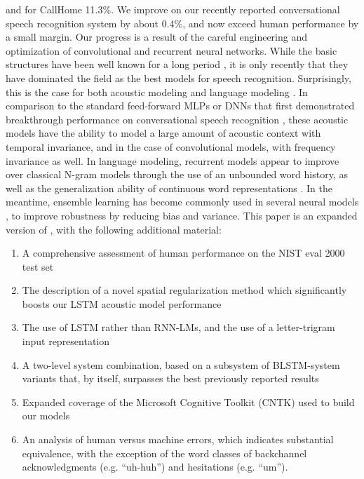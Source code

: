 \documentclass{article}
\begin{document}
and for CallHome 11.3\%. We improve on our recently reported
conversational speech recognition system \cite{ms-swb-icassp2017} by about 0.4\%, and now 
exceed human performance by a small margin. 
Our progress is a result of the careful engineering and optimization
of convolutional and recurrent neural networks. While the 
basic structures have been well known
for a long period \cite{pineda1987generalization,williams1989learning,waibel1989phoneme,lecun1995convolutional,lecun1989backpropagation,robinson1991recurrent,hochreiter1997long},
it is only recently that they have dominated the field as the best models for
speech recognition. Surprisingly, this is the case for both acoustic
modeling \cite{sak2014long,sak2015fast,saon2015ibm,sercu2016very,bi2015very,qian2016very} 
and language modeling \cite{mikolov2010recurrent,mikolov2012context,sundermeyer2012lstm,medennikov2016improving}. 
In comparison to the standard feed-forward MLPs or DNNs
that first demonstrated breakthrough performance on conversational 
speech recognition \cite{seide2011conversational}, these acoustic models
have the ability to model a large amount of acoustic context with temporal
invariance, and in the case of convolutional models, with frequency invariance
as well.
In language modeling, recurrent models appear to improve over classical N-gram models
through the use of an unbounded word history, as well as 
the generalization ability of continuous word representations \cite{mikolov2013linguistic}.
In the meantime, ensemble learning has 
become commonly used in several neural models \cite{sutskever2014sequence,hannun2014deep,mikolov2012context},
to improve robustness by reducing bias and variance. 
This paper is an expanded version of \cite{ms-swb-icassp2017}, with the following
additional material:
\begin{enumerate}
\item A comprehensive assessment of human performance on the 
NIST eval 2000 test set
\item The description of a novel spatial regularization method which significantly boosts our LSTM acoustic model
performance
\item The use of LSTM rather than RNN-LMs, and the use of a letter-trigram 
input representation
\item A two-level system combination, based on a subsystem of BLSTM-system variants that, by itself, surpasses the 
best previously reported results
\item Expanded coverage of the Microsoft Cognitive Toolkit (CNTK) used to
build our models
\item An analysis of human versus machine errors, which indicates substantial equivalence, with the exception of the word classes of
backchannel acknowledgments (e.g. ``uh-huh'') and hesitations  (e.g. ``um''). 
\end{enumerate}
\end{document}
